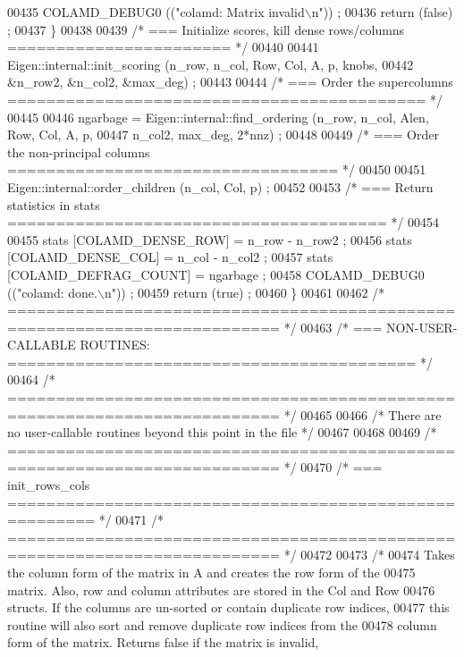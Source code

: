 \begin{DoxyCode}
{{{{{{{00435     COLAMD\_DEBUG0 ((\textcolor{stringliteral}{"colamd: Matrix invalid\(\backslash\)n"})) ;
00436     \textcolor{keywordflow}{return} (\textcolor{keyword}{false}) ;
00437   \}
00438   
00439   \textcolor{comment}{/* === Initialize scores, kill dense rows/columns ======================= */}
00440 
00441   Eigen::internal::init\_scoring (n\_row, n\_col, Row, Col, A, p, knobs,
00442         &n\_row2, &n\_col2, &max\_deg) ;
00443   
00444   \textcolor{comment}{/* === Order the supercolumns =========================================== */}
00445   
00446   ngarbage = Eigen::internal::find\_ordering (n\_row, n\_col, Alen, Row, Col, A, p,
00447                 n\_col2, max\_deg, 2*nnz) ;
00448   
00449   \textcolor{comment}{/* === Order the non-principal columns ================================== */}
00450   
00451   Eigen::internal::order\_children (n\_col, Col, p) ;
00452   
00453   \textcolor{comment}{/* === Return statistics in stats ======================================= */}
00454   
00455   stats [COLAMD\_DENSE\_ROW] = n\_row - n\_row2 ;
00456   stats [COLAMD\_DENSE\_COL] = n\_col - n\_col2 ;
00457   stats [COLAMD\_DEFRAG\_COUNT] = ngarbage ;
00458   COLAMD\_DEBUG0 ((\textcolor{stringliteral}{"colamd: done.\(\backslash\)n"})) ; 
00459   \textcolor{keywordflow}{return} (\textcolor{keyword}{true}) ;
00460 \}
00461 
00462 \textcolor{comment}{/* ========================================================================== */}
00463 \textcolor{comment}{/* === NON-USER-CALLABLE ROUTINES: ========================================== */}
00464 \textcolor{comment}{/* ========================================================================== */}
00465 
00466 \textcolor{comment}{/* There are no user-callable routines beyond this point in the file */}
00467 
00468 
00469 \textcolor{comment}{/* ========================================================================== */}
00470 \textcolor{comment}{/* === init\_rows\_cols ======================================================= */}
00471 \textcolor{comment}{/* ========================================================================== */}
00472 
00473 \textcolor{comment}{/*}
00474 \textcolor{comment}{  Takes the column form of the matrix in A and creates the row form of the}
00475 \textcolor{comment}{  matrix.  Also, row and column attributes are stored in the Col and Row}
00476 \textcolor{comment}{  structs.  If the columns are un-sorted or contain duplicate row indices,}
00477 \textcolor{comment}{  this routine will also sort and remove duplicate row indices from the}
00478 \textcolor{comment}{  column form of the matrix.  Returns false if the matrix is invalid,}
}}}}}}}
\end{DoxyCode}
